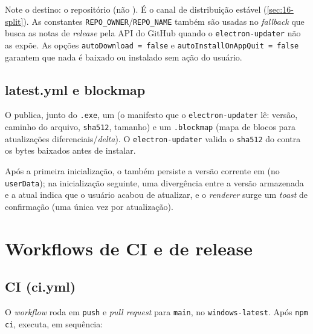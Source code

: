 \noindent
Note o destino: o repositório  (não ). É o canal de
distribuição estável (\autoref{sec:16-split}). As constantes
\texttt{REPO\_OWNER}/\texttt{REPO\_NAME} também são usadas no \emph{fallback} que
busca as notas de \emph{release} pela API do GitHub quando o
\lstinline|electron-updater| não as expõe. As opções
\lstinline|autoDownload = false| e \lstinline|autoInstallOnAppQuit = false|
garantem que nada é baixado ou instalado sem ação do usuário.

\subsection{latest.yml e blockmap}

O  publica, junto do \texttt{.exe}, um 
(o manifesto que o \lstinline|electron-updater| lê: versão, caminho do arquivo,
\texttt{sha512}, tamanho) e um \texttt{.blockmap} (mapa de blocos para
atualizações diferenciais/\emph{delta}). O \lstinline|electron-updater| valida o
\texttt{sha512} do  contra os bytes baixados antes de instalar.

Após a primeira inicialização, o  também persiste a versão
corrente em  (no \texttt{userData}); na inicialização
seguinte, uma divergência entre a versão armazenada e a atual indica que o
usuário acabou de atualizar, e o \emph{renderer} surge um \emph{toast} de
confirmação (uma única vez por atualização).

\section{Workflows de CI e de release}
\label{sec:16-ci}

\subsection{CI (ci.yml)}

O \emph{workflow}  roda em \texttt{push} e
\emph{pull request} para \texttt{main}, no \texttt{windows-latest}. Após
\lstinline|npm ci|, executa, em sequência:

